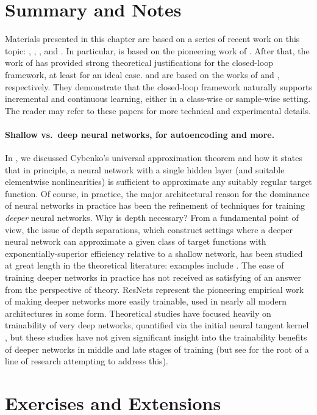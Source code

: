 \documentclass[../../book-main.tex]{subfiles}
\begin{document}
\section{Summary and Notes}
Materials presented in this chapter are based on a series of recent work on this topic: \cite{Dai-entropy-2022}, 
\cite{pai2022pursuit}, \cite{tong2023incremental}, and \cite{pmlr-v234-tong24a}. In particular,  is based on the pioneering work of \cite{Dai-entropy-2022}. After that, the work of \cite{pai2022pursuit} has provided strong theoretical justifications for the closed-loop framework, at least for an ideal case.  and  are based on the works of \cite{tong2023incremental} and \cite{pmlr-v234-tong24a}, respectively. They demonstrate that the closed-loop framework naturally supports incremental and continuous learning, either in a class-wise or sample-wise setting. The reader may refer to these papers for more technical and experimental details.


\paragraph{Shallow vs.\ deep neural networks, for autoencoding and more.}
In , we discussed Cybenko's universal approximation
theorem and how it states that in principle, a neural network with a single
hidden layer (and suitable elementwise nonlinearities) is sufficient to
approximate any suitably regular target function. Of course, in practice, the
major architectural reason for the dominance of neural networks in practice has
been the refinement of techniques for training \textit{deeper} neural networks.
Why is depth necessary?
From a fundamental point of view, the issue of depth separations, which
construct settings where a deeper neural network can approximate a given class
of target functions with exponentially-superior efficiency relative to a shallow
network,
has been studied at great length in the theoretical literature:
examples include \cite{Telgarsky2016-sn,Bresler2020-xy,Venturi2021-qc}. 
The ease of training deeper
networks in practice has not received as satisfying of an answer from the
perspective of theory. 
ResNets \cite{he2016deep} represent the pioneering empirical work of
making deeper networks more easily trainable, used in nearly all modern
architectures in some form. Theoretical studies have focused heavily on
trainability of very deep networks, quantified via the initial neural tangent
kernel \cite{Buchanan2021-sj,Martens2021-cx}, but these studies have not given
significant insight into the trainability benefits of deeper networks in middle
and late stages of training (but see \cite{Yang2021-gw} for the root of a line
of research attempting to address this).

\section{Exercises and Extensions}
\end{document}
